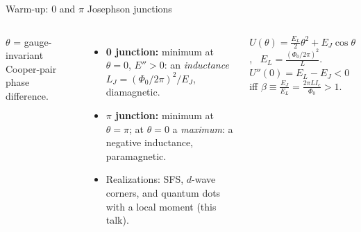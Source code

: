 \documentclass[aspectratio=169,9pt]{beamer}
\begin{document}
\begin{frame}{Warm-up: 0 and $\pi$ Josephson junctions}
  \begin{columns}[c]
    \par\small $\theta$ = gauge-invariant Cooper-pair phase difference.
    \begin{itemize}\small
      \item \textbf{0 junction:} minimum at $\theta=0$, $E''>0$: an \emph{inductance} $L_J=(\Phi_0/2\pi)^2/E_J$, diamagnetic.
      \item \textbf{$\pi$ junction:} minimum at $\theta=\pi$; at $\theta=0$ a \emph{maximum}: a \alert{negative inductance},
            paramagnetic.
      \item Realizations: SFS, $d$-wave corners, and \alert{quantum dots with a local moment} (this talk).
    \end{itemize}
    \begin{calcbox}[title={Classical $\pi$ rf-SQUID}]
      \small $U(\theta)=\frac{E_L}{2}\theta^2+E_J\cos\theta$, \ $E_L=\frac{(\Phi_0/2\pi)^2}{L}$.\\
      $U''(0)=E_L-E_J<0$ iff $\beta\equiv\frac{E_J}{E_L}=\frac{2\pi LI_c}{\Phi_0}>1$.
    \end{calcbox}
  \end{columns}
\end{frame}
\end{document}
